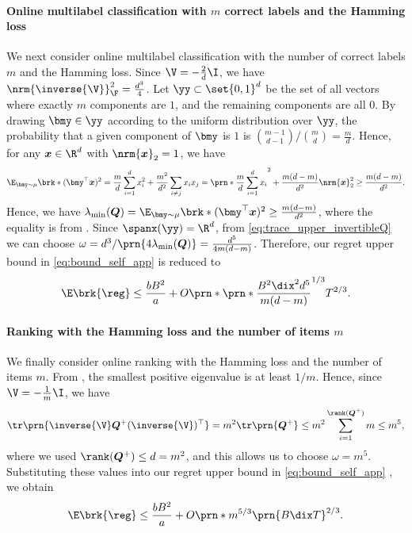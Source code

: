 \paragraph{Online multilabel classification with $m$ correct labels   
and the Hamming loss}
We next consider online multilabel classification with the number of correct labels $m$  
and the Hamming loss.  
Since $\V=-\frac{2}{d}\I$, we have  
$\nrm{\inverse{\V}}_\F^2=\frac{d^3}{4}$.  
Let $\yy\subset\set{0,1}^d$ be the set of all vectors  
where exactly $m$ components are $1$, and the remaining components are all $0$.  
By drawing $\bmy\in\yy$ according to the uniform distribution over $\yy$,  
the probability that a given component of $\bmy$ is $1$ is  
$\binom{m-1}{d-1}/\binom{m}{d}=\frac{m}{d}$.  
Hence, for any $\bm x\in\R^d$ with $\nrm{\bm{x}}_2=1$,  
we have
\[
\E_{\bmy\sim\mu}\brk*{(\bmy^\top\bm x)^2}
=\frac{m}{d}\sum_{i=1}^dx_i^2  
+\frac{m^2}{d^2}\sum_{i\neq j}x_ix_j  
=\prn*{\frac{m}{d}\sum_{i=1}^dx_i}^2+\frac{m(d-m)}{d^2}\nrm{\bm x}_2^2  
\geq 
\frac{m(d-m)}{d^2}.
\]
Hence, we have $\lambda_{\min}(\bm{Q}) = \E_{\bmy\sim\mu}\brk*{(\bmy^\top\bm x)^2} \geq\frac{m(d-m)}{d^2}$, where the equality is from \citet[Lemma 2]{comband}.
Since $\spanx(\yy) = \R^d$,
from \eqref{eq:trace_upper_invertibleQ} we can choose $\omega = d^3 / \prn{4 \lambda_{\min}(\bm{Q})} = \frac{d^5}{4 m (d-m)} $.
Therefore, our regret upper bound in \eqref{eq:bound_self_app} is reduced to
\begin{equation*}
    \E\brk{\reg}
    \leq
    \frac{bB^2}{a}
    +
    O \prn*{ \prn*{\frac{B^2\dix ^2d^5}{m(d-m)}}^{1/3} T^{2/3} }.
\end{equation*}


\paragraph{Ranking with the Hamming loss and the number of items $m$}
We finally consider online ranking with the Hamming loss and the number of items $m$.  
From \citet[Proposition 4]{comband}, the smallest positive eigenvalue is at least $1/m$.
Hence, since $\V=-\frac{1}{m}\I$, we have
\begin{equation*}
\tr\prn{\inverse{\V}\bm{Q}^+(\inverse{\V})^\top}=m^2\tr\prn{\bm{Q}^+}\leq m^2\sum_{i=1}^{\rank(\bm{Q}^+)} m\leq m^5,
\end{equation*}
where we used $\rank(\bm{Q}^+) \leq d = m^2$,
and this allows us to choose $\omega = m^5$.
Substituting these values into our regret upper bound in \eqref{eq:bound_self_app} , we obtain  
\begin{equation*}
    \E\brk{\reg}\leq\frac{bB^2}{a}+ O\prn*{ m^{5/3}\prn{B\dix T}^{2/3} }.
\end{equation*}  

